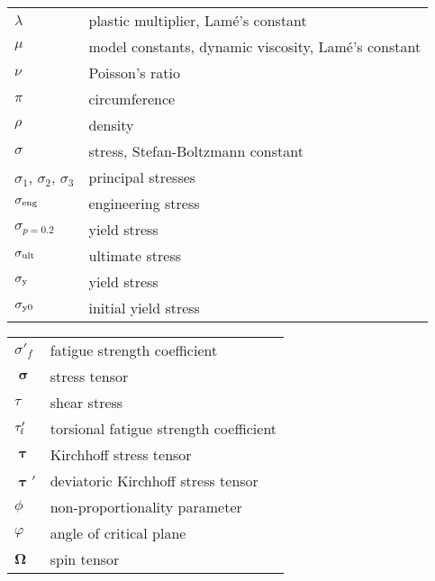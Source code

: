\begin{table}[htb]
\begin{tabular}{p{3cm}p{10.5cm}}
    $\lambda$ & plastic multiplier, Lam\'{e}'s constant \\
    $\mu$ & model constants, dynamic viscosity, Lam\'{e}'s constant \\
    $\nu$ & Poisson's ratio \\
    $\pi$ & circumference \\
    $\rho$ & density \\
    $\sigma$ & stress, Stefan-Boltzmann constant \\
    $\sigma_1$, $\sigma_2$, $\sigma_3$  & principal stresses \\
    $\sigma_{\rm{eng}}$  & engineering stress \\
    $\sigma_{p=0.2}$  & yield stress \\
    $\sigma_{\rm{ult}}$  & ultimate stress \\
    $\sigma_{\rm{y}}$  & yield stress \\
    $\sigma_{\rm{y0}}$  & initial yield stress \\
    \end{tabular}%
  \label{Tab:greek_1}%
\end{table}%

\begin{table}[htb]
  \centering
    \begin{tabular}{p{3cm}p{10.5cm}}
    $\sigma'_f$ & fatigue strength coefficient \\
    $\bm{\upsigma}$ & stress tensor \\
    $\tau$  & shear stress \\
    $\tau'_{\rm{f}}$ & torsional fatigue strength coefficient \\
    $\bm{\uptau}$ & Kirchhoff stress tensor \\
    $\bm{\uptau}'$ & deviatoric Kirchhoff stress tensor \\
    $\phi$ & non-proportionality parameter \\
    $\varphi$ & angle of critical plane \\
    $\bm{\Omega}$ & spin tensor \\
    \end{tabular}%
  \label{Tab:greek_1}%
\end{table}%

